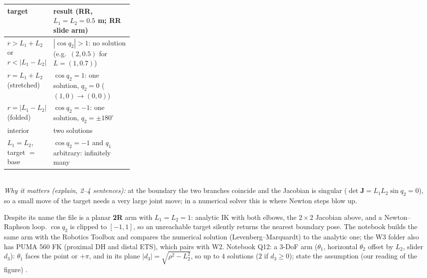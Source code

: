 \begin{multicols}{2}
\begin{tabularx}{\linewidth}{@{}>{\raggedright\arraybackslash}p{0.3\linewidth}>{\raggedright\arraybackslash}X@{}}
\toprule target & result (RR, $L_1=L_2=0.5$ m; RR slide arm)\\\midrule
$r>L_1+L_2$ or $r<|L_1-L_2|$ & $|\cos q_2|>1$: no solution (e.g.\ $(2,0.5)$ for $L=(1,0.7)$)\\
$r=L_1+L_2$ (stretched) & $\cos q_2=1$: one solution, $q_2=0$ ($(1,0)\to(0,0)$)\\
$r=|L_1-L_2|$ (folded) & $\cos q_2=-1$: one solution, $q_2=\pm180^\circ$\\
interior & two solutions\\
$L_1=L_2$, target $=$ base & $\cos q_2=-1$ and $q_1$ arbitrary: infinitely many\\
\bottomrule
\end{tabularx}\\
\emph{Why it matters (explain, 2--4 sentences):} at the boundary the two branches coincide and the Jacobian is singular ($\det\mathbf J=L_1L_2\sin q_2=0$), so a small move of the target needs a very large joint move; in a numerical solver this is where Newton steps blow up.

Despite its name the file is a planar \textbf{2R} arm with $L_1=L_2=1$: analytic IK with both elbows, the $2\times2$ Jacobian above, and a Newton--Raphson loop. $\cos q_2$ is clipped to $[-1,1]$, so an unreachable target silently returns the nearest boundary pose. The notebook builds the same arm with the Robotics Toolbox and compares the numerical solution (Levenberg--Marquardt) to the analytic one; the W3 folder also has PUMA 560 FK (proximal DH and distal ETS), which pairs with W2. Notebook Q12: a 3-DoF arm ($\theta_1$, horizontal $\theta_2$ offset by $L_2$, slider $d_3$): $\theta_1$ faces the point or $+\pi$, and in its plane $|d_3|=\sqrt{\rho^2-L_2^2}$, so up to $4$ solutions ($2$ if $d_3\ge0$); state the assumption (our reading of the figure) \added.


\end{multicols}
